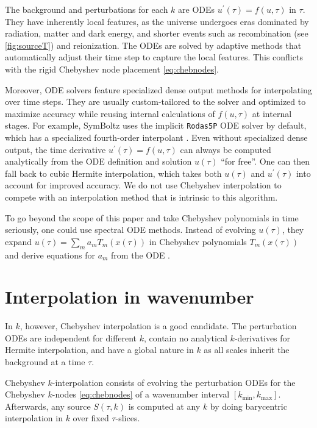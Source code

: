 \documentclass{aa}
\newcommand\kmin{{k_\text{min}}}
\newcommand\kmax{{k_\text{max}}}
\begin{document}
The background and perturbations for each $k$ are ODEs $u^\prime(\tau) = f(u, \tau)$ in $\tau$.
They have inherently local features,
as the universe undergoes eras dominated by radiation, matter and dark energy,
and shorter events such as recombination (see \cref{fig:sourceT}) and reionization.
The ODEs are solved by adaptive methods that automatically adjust their time step to capture the local features.
This conflicts with the rigid Chebyshev node placement \eqref{eq:chebnodes}.

Moreover, ODE solvers feature specialized dense output methods for interpolating over time steps.
They are usually custom-tailored to the solver and optimized to maximize accuracy while reusing internal calculations of $f(u, \tau)$ at internal stages.
For example, SymBoltz uses the implicit \texttt{Rodas5P} ODE solver by default,
which has a specialized fourth-order interpolant \citep{steinebachConstructionRosenbrockWanner2023a}.
Even without specialized dense output,
the time derivative $u^\prime(\tau) = f(u, \tau)$ can always be computed analytically from the ODE definition and solution $u(\tau)$ \enquote{for free}.
One can then fall back to cubic Hermite interpolation,
which takes both $u(\tau)$ and $u^\prime(\tau)$ into account for improved accuracy.
We do not use Chebyshev interpolation to compete with an interpolation method that is intrinsic to this algorithm.

To go beyond the scope of this paper and take Chebyshev polynomials in time seriously,
one could use spectral ODE methods.
Instead of evolving $u(\tau)$,
they expand $u(\tau) = \sum_m a_m T_m(x(\tau))$ in Chebyshev polynomials $T_m(x(\tau))$
and derive equations for $a_m$ from the ODE
\citep[e.g.][]{choustikovOptimizingEvolutionPerturbations2023,ranaSpectralChebyshevApproximation2025}.

\section{Interpolation in wavenumber}
\label{sec:wavenumbers}

In $k$, however, Chebyshev interpolation is a good candidate.
The perturbation ODEs are independent for different $k$,
contain no analytical $k$-derivatives for Hermite interpolation,
and have a global nature in $k$ as all scales inherit the background at a time $\tau$.

Chebyshev $k$-interpolation consists of evolving the perturbation ODEs for the Chebyshev $k$-nodes \eqref{eq:chebnodes} of a wavenumber interval $[\kmin, \kmax]$.
Afterwards, any source $S(\tau, k)$ is computed at any $k$ by doing barycentric interpolation in $k$ over fixed $\tau$-slices.
\end{document}
